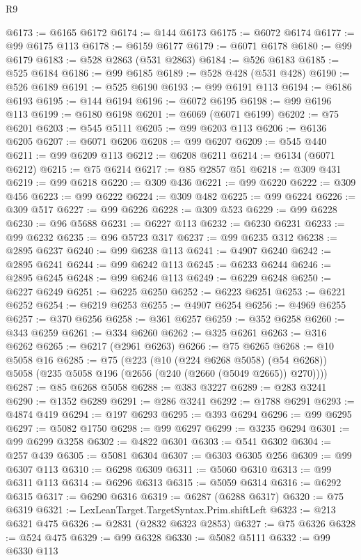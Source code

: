 \begin{lexlean}{R9}
\begin{coremodule}
@6173 := @6165 @6172
@6174 := @144 @6173
@6175 := @6072 @6174
@6177 := @99 @6175 @113
@6178 := @6159 @6177
@6179 := @6071 @6178
@6180 := @99 @6179
@6183 := @528 @2863 (@531 @2863)
@6184 := @526 @6183
@6185 := @525 @6184
@6186 := @99 @6185
@6189 := @528 @428 (@531 @428)
@6190 := @526 @6189
@6191 := @525 @6190
@6193 := @99 @6191 @113
@6194 := @6186 @6193
@6195 := @144 @6194
@6196 := @6072 @6195
@6198 := @99 @6196 @113
@6199 := @6180 @6198
@6201 := @6069 (@6071 @6199)
@6202 := @75 @6201
@6203 := @545 @5111
@6205 := @99 @6203 @113
@6206 := @6136 @6205
@6207 := @6071 @6206
@6208 := @99 @6207
@6209 := @545 @440
@6211 := @99 @6209 @113
@6212 := @6208 @6211
@6214 := @6134 (@6071 @6212)
@6215 := @75 @6214
@6217 := @85 @2857 @51
@6218 := @309 @431
@6219 := @99 @6218
@6220 := @309 @436
@6221 := @99 @6220
@6222 := @309 @456
@6223 := @99 @6222
@6224 := @309 @482
@6225 := @99 @6224
@6226 := @309 @517
@6227 := @99 @6226
@6228 := @309 @523
@6229 := @99 @6228
@6230 := @96 @5688
@6231 := @6227 @113
@6232 := @6230 @6231
@6233 := @99 @6232
@6235 := @96 @5723 @317
@6237 := @99 @6235 @312
@6238 := @2895 @6237
@6240 := @99 @6238 @113
@6241 := @4907 @6240
@6242 := @2895 @6241
@6244 := @99 @6242 @113
@6245 := @6233 @6244
@6246 := @2895 @6245
@6248 := @99 @6246 @113
@6249 := @6229 @6248
@6250 := @6227 @6249
@6251 := @6225 @6250
@6252 := @6223 @6251
@6253 := @6221 @6252
@6254 := @6219 @6253
@6255 := @4907 @6254
@6256 := @4969 @6255
@6257 := @370 @6256
@6258 := @361 @6257
@6259 := @352 @6258
@6260 := @343 @6259
@6261 := @334 @6260
@6262 := @325 @6261
@6263 := @316 @6262
@6265 := @6217 (@2961 @6263)
@6266 := @75 @6265
@6268 := @10 @5058 @16
@6285 := @75
    (@223
      (@10 (@224 @6268 @5058) (@54 @6268))
      @5058
      (@235 @5058 @196 (@2656 (@240 (@2660 (@5049 @2665)) @270))))
@6287 := @85 @6268 @5058
@6288 := @383 @3227
@6289 := @283 @3241
@6290 := @1352 @6289
@6291 := @286 @3241
@6292 := @1788 @6291
@6293 := @4874 @419
@6294 := @197 @6293
@6295 := @393 @6294
@6296 := @99 @6295
@6297 := @5082 @1750
@6298 := @99 @6297
@6299 := @3235 @6294
@6301 := @99 @6299 @3258
@6302 := @4822 @6301
@6303 := @541 @6302
@6304 := @257 @439
@6305 := @5081 @6304
@6307 := @6303 @6305 @256
@6309 := @99 @6307 @113
@6310 := @6298 @6309
@6311 := @5060 @6310
@6313 := @99 @6311 @113
@6314 := @6296 @6313
@6315 := @5059 @6314
@6316 := @6292 @6315
@6317 := @6290 @6316
@6319 := @6287 (@6288 @6317)
@6320 := @75 @6319
@6321 := LexLeanTarget.TargetSyntax.Prim.shiftLeft
@6323 := @213 @6321 @475
@6326 := @2831 (@2832 @6323 @2853)
@6327 := @75 @6326
@6328 := @524 @475
@6329 := @99 @6328
@6330 := @5082 @5111
@6332 := @99 @6330 @113

\end{coremodule}
\end{lexlean}

